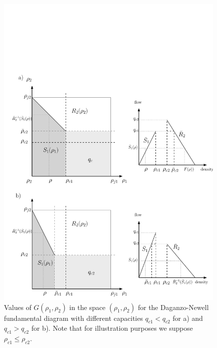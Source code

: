 \documentclass[11pt]{article}
\numberwithin{equation}{section}
\numberwithin{figure}{section}
\numberwithin{table}{section}
\begin{document}
\begin{figure}[ht]
  \centering
    \includegraphics[width=12cm]{godunovDiagram3.pdf}
    \caption{Values of $G(\rho_{1},\rho_{2})$ in the space $(\rho_{1},\rho_{2})$ for the Daganzo-Newell fundamental diagram with different capacities $q_{c1} < q_{c2}$ for a) and $q_{c1} > q_{c2}$ for b). Note that for illustration purposes we suppose $\rho_{c1}\leq\rho_{c2}$.}
    \label{fig:godunovDiagram3}
\end{figure}
\end{document}
